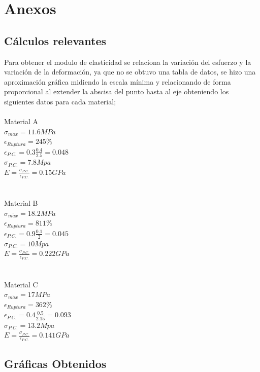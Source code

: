 \documentclass[a4paper, 11pt]{article}
\begin{document}
\newpage      

\section{Anexos}

\subsection{Cálculos relevantes}\label{subsec:calculos}

Para obtener el modulo de elasticidad se relaciona la variación del esfuerzo y la variación de la deformación, ya que no se obtuvo una tabla de datos, se hizo una aproximación gráfica midiendo la escala mínima y relacionando de forma proporcional al extender la abscisa del punto hasta al eje obteniendo los siguientes datos para cada material;\\
\\
Material A\\
$\sigma_{m\acute{a}x}=11.6 MPa$\\
$\epsilon_{Ruptura}=245\%$\\
$\epsilon_{P.C.} = 0.3\frac{0.4}{2.5}=0.048$\\
$\sigma_{P.C.}=7.8 Mpa$\\     
$E=\frac{\sigma_{P.C.}}{\epsilon_{P.C.}}=0.15 GPa$\\
\\
\\
Material B\\
$\sigma_{m\acute{a}x}=18.2 MPa$\\
$\epsilon_{Ruptura}=811\%$\\
$\epsilon_{P.C.} = 0.9\frac{0.1}{2}=0.045$\\
$\sigma_{P.C.}=10 Mpa$\\     
$E=\frac{\sigma_{P.C.}}{\epsilon_{P.C.}}=0.222 GPa$\\
\\
\\
Material C\\
$\sigma_{m\acute{a}x}=17 MPa$\\
$\epsilon_{Ruptura}=362\%$\\
$\epsilon_{P.C.} = 0.4\frac{0.5}{2.15}=0.093$\\
$\sigma_{P.C.}=13.2 Mpa$\\     
$E=\frac{\sigma_{P.C.}}{\epsilon_{P.C.}}=0.141 GPa$\\

\newpage


\subsection{Gráficas Obtenidos}
\end{document}

